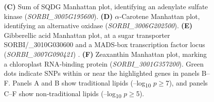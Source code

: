 \documentclass[10pt,letterpaper]{article}
\begin{document}
\begin{itemize}
\begin{figure}[htbp]
{    \textbf{(C)} Sum of SQDG Manhattan plot, identifying an adenylate sulfate kinase (\textit{SORBI\_3005G195600}).  
    \textbf{(D)} \(\alpha\)‐Carotene Manhattan plot, identifying an alternative oxidase (\textit{SORBI\_3006G202500}).  
    \textbf{(E)} Gibberellic acid Manhattan plot, at a sugar transporter SORBI/_3010G030600 and a MADS‐box transcription factor locus (\textit{SORBI\_3007G090421}) .  
    \textbf{(F)} Zeaxanthin Manhattan plot, marking a chloroplast RNA‐binding protein (\textit{SORBI\_3001G357200}).  
    Green dots indicate SNPs within or near the highlighted genes in panels B–F. Panels A and B show traditional lipids (–log\textsubscript{10} $p$\(\geq\)7), and panels C–F show non‐traditional lipids (–log\textsubscript{10} $p$\(\geq\)5).}
  \label{fig:Fig3}
\end{figure}








\end{itemize}
\end{document}
